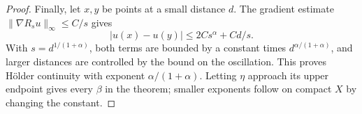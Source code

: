 \begin{proof}
Finally, let $x,y$ be points at a small distance $d$. The gradient estimate $\|\nabla R_su\|_\infty\leq C/s$ gives
\[
 |u(x)-u(y)|\leq2Cs^\alpha+C d/s.
\]
With $s=d^{1/(1+\alpha)}$, both terms are bounded by a constant times $d^{\alpha/(1+\alpha)}$, and larger distances are controlled by the bound on the oscillation. This proves H\"older continuity with exponent $\alpha/(1+\alpha)$. Letting $\eta$ approach its upper endpoint gives every $\beta$ in the theorem; smaller exponents follow on compact $X$ by changing the constant.
\end{proof}


